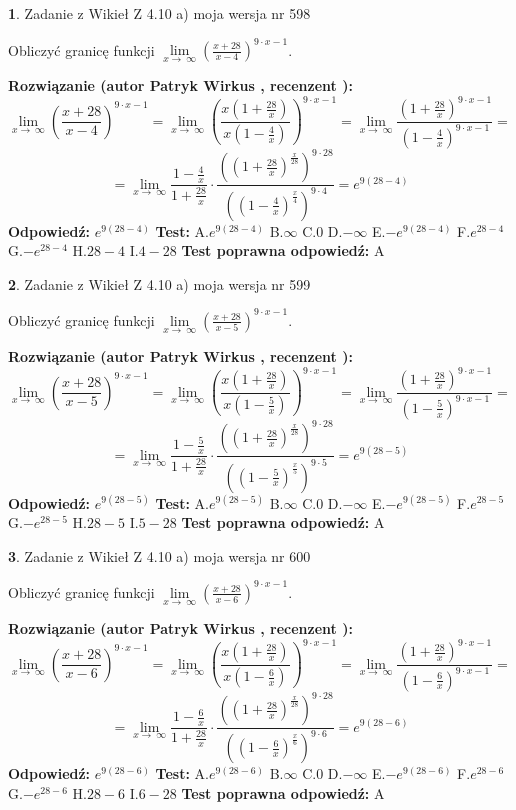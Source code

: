 \documentclass[12pt, a4paper]{article}
\theoremstyle{definition} %
\newtheorem{zad}{}
\newcommand{\zadStart}[1]{\begin{zad}#1\newline}
\newcommand{\zadStop}{\end{zad}}
\newcommand{\rozwStart}[2]{\noindent \textbf{Rozwiązanie (autor #1 , recenzent #2): }\newline}
\newcommand{\rozwStop}{\newline}
\newcommand{\odpStart}{\noindent \textbf{Odpowiedź:}\newline}
\newcommand{\odpStop}{\newline}
\newcommand{\testStart}{\noindent \textbf{Test:}\newline}
\newcommand{\testStop}{\newline}
\newcommand{\kluczStart}{\noindent \textbf{Test poprawna odpowiedź:}\newline}
\newcommand{\kluczStop}{\newline}
\begin{document}
\zadStart{Zadanie z Wikieł Z 4.10 a) moja wersja nr 598}


Obliczyć granicę funkcji  $\lim\limits_{x\to\ \infty}(\frac{x+28}{x-4})^{9\cdot x-1}$.
\zadStop
\rozwStart{Patryk Wirkus}{}
$$\lim\limits_{x\to\ \infty}(\frac{x+28}{x-4})^{9\cdot x-1} = \lim\limits_{x\to\ \infty}(\frac{x(1+\frac{28}{x})}{x(1-\frac{4}{x})})^{9\cdot x-1}=\lim\limits_{x\to\ \infty}\frac{(1+\frac{28}{x})^{9\cdot x-1}}{(1-\frac{4}{x})^{9\cdot x-1}}=$$
$$=\lim\limits_{x\to\ \infty}\frac{1-\frac{4}{x}}{1+\frac{28}{x}}\cdot\frac{((1+\frac{28}{x})^{\frac{x}{28}})^{9\cdot28}}{((1-\frac{4}{x})^{\frac{x}{4}})^{9\cdot4}}=e^{9(28-4)}$$
\rozwStop
\odpStart
$e^{9(28-4)}$
\odpStop
\testStart
A.$e^{9(28-4)}$ B.$\infty$ C.$0$ D.$-\infty$ E.$-e^{9(28-4)}$
F.$e^{28-4}$ G.$-e^{28-4}$
H.$28-4$
I.$4-28$
\testStop
\kluczStart
A
\kluczStop



\zadStart{Zadanie z Wikieł Z 4.10 a) moja wersja nr 599}


Obliczyć granicę funkcji  $\lim\limits_{x\to\ \infty}(\frac{x+28}{x-5})^{9\cdot x-1}$.
\zadStop
\rozwStart{Patryk Wirkus}{}
$$\lim\limits_{x\to\ \infty}(\frac{x+28}{x-5})^{9\cdot x-1} = \lim\limits_{x\to\ \infty}(\frac{x(1+\frac{28}{x})}{x(1-\frac{5}{x})})^{9\cdot x-1}=\lim\limits_{x\to\ \infty}\frac{(1+\frac{28}{x})^{9\cdot x-1}}{(1-\frac{5}{x})^{9\cdot x-1}}=$$
$$=\lim\limits_{x\to\ \infty}\frac{1-\frac{5}{x}}{1+\frac{28}{x}}\cdot\frac{((1+\frac{28}{x})^{\frac{x}{28}})^{9\cdot28}}{((1-\frac{5}{x})^{\frac{x}{5}})^{9\cdot5}}=e^{9(28-5)}$$
\rozwStop
\odpStart
$e^{9(28-5)}$
\odpStop
\testStart
A.$e^{9(28-5)}$ B.$\infty$ C.$0$ D.$-\infty$ E.$-e^{9(28-5)}$
F.$e^{28-5}$ G.$-e^{28-5}$
H.$28-5$
I.$5-28$
\testStop
\kluczStart
A
\kluczStop



\zadStart{Zadanie z Wikieł Z 4.10 a) moja wersja nr 600}


Obliczyć granicę funkcji  $\lim\limits_{x\to\ \infty}(\frac{x+28}{x-6})^{9\cdot x-1}$.
\zadStop
\rozwStart{Patryk Wirkus}{}
$$\lim\limits_{x\to\ \infty}(\frac{x+28}{x-6})^{9\cdot x-1} = \lim\limits_{x\to\ \infty}(\frac{x(1+\frac{28}{x})}{x(1-\frac{6}{x})})^{9\cdot x-1}=\lim\limits_{x\to\ \infty}\frac{(1+\frac{28}{x})^{9\cdot x-1}}{(1-\frac{6}{x})^{9\cdot x-1}}=$$
$$=\lim\limits_{x\to\ \infty}\frac{1-\frac{6}{x}}{1+\frac{28}{x}}\cdot\frac{((1+\frac{28}{x})^{\frac{x}{28}})^{9\cdot28}}{((1-\frac{6}{x})^{\frac{x}{6}})^{9\cdot6}}=e^{9(28-6)}$$
\rozwStop
\odpStart
$e^{9(28-6)}$
\odpStop
\testStart
A.$e^{9(28-6)}$ B.$\infty$ C.$0$ D.$-\infty$ E.$-e^{9(28-6)}$
F.$e^{28-6}$ G.$-e^{28-6}$
H.$28-6$
I.$6-28$
\testStop
\kluczStart
A
\kluczStop
\end{document}
